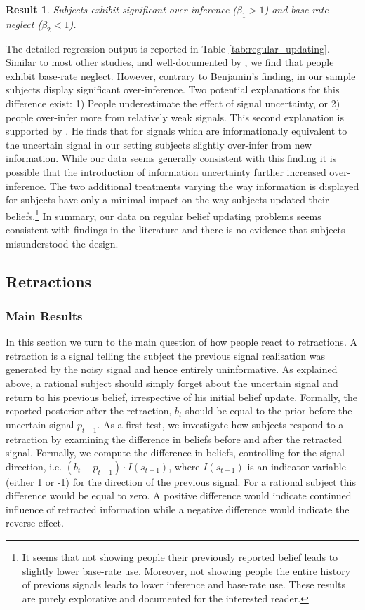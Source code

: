 \documentclass{article}
\newtheorem{result}{Result}
\newenvironment{Result}{\begin{result} \rm }{\end{result}}
\begin{document}
\begin{Result}
Subjects exhibit significant over-inference ($\beta_1>1$) and base rate neglect ($\beta_2<1$).
\end{Result}

The detailed regression output is reported in Table \ref{tab:regular_updating}. Similar to most other studies, and well-documented by \cite{Benjamin2019}, we find that people exhibit base-rate neglect. However, contrary to Benjamin's finding, in our sample subjects display significant over-inference. Two potential explanations for this difference exist: 1) People underestimate the effect of signal uncertainty, or 2) people over-infer more from relatively weak signals. This second explanation is supported by \cite{Thaler2021}. He finds that for signals which are informationally equivalent to the uncertain signal in our setting subjects slightly over-infer from new information. While our data seems generally consistent with this finding it is possible that the introduction of information uncertainty further increased over-inference. The two additional treatments varying the way information is displayed for subjects have only a minimal impact on the way subjects updated their beliefs.\footnote{It seems that not showing people their previously reported belief leads to slightly lower base-rate use. Moreover, not showing people the entire history of previous signals leads to lower inference and base-rate use. These results are purely explorative and documented for the interested reader.} In summary, our data on regular belief updating problems seems consistent with findings in the literature and there is no evidence that subjects misunderstood the design.


\subsection{Retractions}

\subsubsection{Main Results}

In this section we turn to the main question of how people react to retractions. A retraction is a signal telling the subject the previous signal realisation was generated by the noisy signal and hence entirely uninformative. As explained above, a rational subject should simply forget about the uncertain signal and return to his previous belief, irrespective of his initial belief update. Formally, the reported posterior after the retraction, $b_t$ should be equal to the prior before the uncertain signal $p_{t-1}$. As a first test, we investigate how subjects respond to a retraction by examining the difference in beliefs before and after the retracted signal. Formally, we compute the difference in beliefs, controlling for the signal direction, i.e. $(b_t-p_{t-1}) \cdot I(s_{t-1})$, where $I(s_{t-1})$ is an indicator variable (either 1 or -1) for the direction of the previous signal. For a rational subject this difference would be equal to zero. A positive difference would indicate continued influence of retracted information while a negative difference would indicate the reverse effect. 
\end{document}
